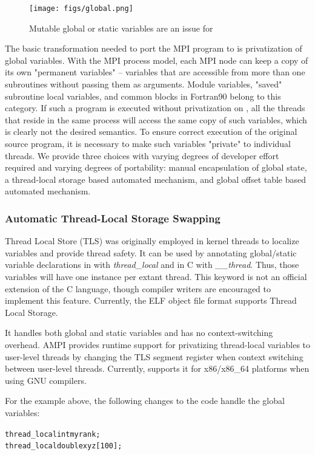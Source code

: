 \documentclass[10pt]{article}
\begin{document}
\begin{figure}[h]
\centering
\texttt{[image: figs/global.png]}
\caption{Mutable global or static variables are an issue for \ampi{}}
\label{fig_global}
\end{figure}

The basic transformation needed to port the MPI program to \ampi{} is
privatization of global variables.
With the MPI process model, each MPI node can keep a copy of its own
"permanent variables" -- variables that are accessible from more than one
subroutines without passing them as arguments.  Module variables, "saved"
subroutine local variables, and common blocks in Fortran90 belong to this
category. If such a program is executed without privatization on \ampi{}, all
the \ampi{} threads that reside in the same process will access the same copy of
such variables, which is clearly not the desired semantics.  To ensure correct
execution of the original source program, it is necessary to make such
variables "private" to individual threads. We provide three choices with varying
degrees of developer effort required and varying degrees of portability:
manual encapsulation of global state, a thread-local storage based automated mechanism, and
global offset table based automated mechanism.

\subsubsection{Automatic Thread-Local Storage Swapping}
Thread Local Store (TLS) was originally employed in kernel threads to
localize variables and provide thread safety. It can be used by annotating
global/static variable declarations in \CC{} with \emph{thread\_local}
and in C with \emph{\_\_thread}. Thus, those variables will have one instance
per extant thread. This keyword is not an official extension of the C language,
though compiler writers are encouraged to implement this feature. Currently,
the ELF object file format supports Thread Local Storage.

It handles both global and static variables and has no context-switching
overhead. AMPI provides runtime support for privatizing thread-local variables to user-level threads
by changing the TLS segment register when context switching between user-level threads.
Currently, \charmpp{} supports it for x86/x86\_64 platforms when using GNU compilers.

For the example above, the following changes to the code handle the global variables:
\begin{alltt}
thread_local int myrank;
thread_local double xyz[100];
\end{alltt}
\end{document}

